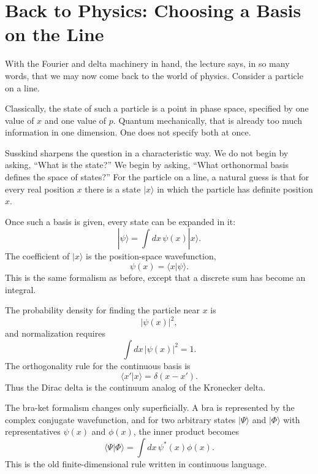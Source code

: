\section{Back to Physics: Choosing a Basis on the Line}

With the Fourier and delta machinery in hand, the lecture says, in so many words, that we may now come back to the world of physics. Consider a particle on a line.

Classically, the state of such a particle is a point in phase space, specified by one value of $x$ and one value of $p$. Quantum mechanically, that is already too much information in one dimension. One does not specify both at once.

Susskind sharpens the question in a characteristic way. We do not begin by asking, ``What is the state?'' We begin by asking, ``What orthonormal basis defines the space of states?'' For the particle on a line, a natural guess is that for every real position $x$ there is a state $|x\rangle$ in which the particle has definite position $x$.

Once such a basis is given, every state can be expanded in it:
\begin{equation}
|\psi\rangle=\int dx\,\psi(x)|x\rangle.
\end{equation}
The coefficient of $|x\rangle$ is the position-space wavefunction,
\begin{equation}
\psi(x)=\langle x|\psi\rangle.
\end{equation}
This is the same formalism as before, except that a discrete sum has become an integral.

The probability density for finding the particle near $x$ is
\begin{equation}
|\psi(x)|^2,
\end{equation}
and normalization requires
\begin{equation}
\int dx\,|\psi(x)|^2=1.
\end{equation}
The orthogonality rule for the continuous basis is
\begin{equation}
\langle x'|x\rangle=\delta(x-x').
\end{equation}
Thus the Dirac delta is the continuum analog of the Kronecker delta.

The bra-ket formalism changes only superficially. A bra is represented by the complex conjugate wavefunction, and for two arbitrary states $|\Psi\rangle$ and $|\Phi\rangle$ with representatives $\psi(x)$ and $\phi(x)$, the inner product becomes
\begin{equation}
\langle \Psi|\Phi\rangle=\int dx\,\psi^*(x)\phi(x).
\end{equation}
This is the old finite-dimensional rule written in continuous language.

